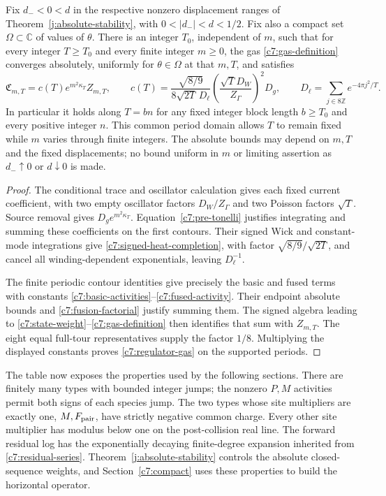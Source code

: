 \begin{proposition}\label{c7:gas-identity}
Fix $d_-<0<d$ in the respective nonzero displacement ranges of
Theorem~\ref{j:absolute-stability}, with $0<|d_-|<d<1/2$.
Fix also a compact set $\Omega\subset\mathbb C$ of values of $\theta$.
There is an integer $T_0$, independent of $m$, such that for every integer
$T\ge T_0$ and every finite integer $m\ge0$, the gas
\eqref{c7:gas-definition} converges absolutely, uniformly for
$\theta\in\Omega$ at that $m,T$, and satisfies
\begin{equation}\label{c7:regulator-gas}
\mathfrak C_{m,T}=c(T)e^{m^2\kappa_T}Z_{m,T},\qquad
c(T)=\frac{\sqrt{8/9}}{8\sqrt{2T}\,D_\ell}
 \left(\frac{\sqrt T D_W}{Z_\Gamma}\right)^2D_g,
\qquad D_\ell=\sum_{j\in8\mathbb Z}e^{-4\pi j^2/T}.
\end{equation}
In particular it holds along $T=bn$ for any fixed integer block length
$b\ge T_0$ and every positive integer $n$.  This common period domain allows
$T$ to remain fixed while $m$ varies through finite integers.  The absolute
bounds may depend on $m,T$ and the fixed displacements; no bound uniform in
$m$ or limiting assertion as $d_-\uparrow0$ or $d\downarrow0$ is made.
\end{proposition}

\begin{proof}
The conditional trace and oscillator calculation gives each fixed current
coefficient, with two empty oscillator factors $D_W/Z_\Gamma$ and
two Poisson factors $\sqrt T$.  Source removal gives
$D_g e^{m^2\kappa_T}$.  Equation~\eqref{c7:pre-tonelli} justifies integrating
and summing these coefficients on the first contours.  Their signed Wick
and constant-mode integrations give \eqref{c7:signed-heat-completion}, with
factor $\sqrt{8/9}/\sqrt{2T}$, and cancel all winding-dependent exponentials,
leaving $D_\ell^{-1}$.

The finite periodic contour identities give precisely the basic and fused
terms with constants \eqref{c7:basic-activities}--\eqref{c7:fused-activity}.
Their endpoint absolute bounds and \eqref{c7:fusion-factorial} justify
summing them.  The signed algebra leading to
\eqref{c7:state-weight}--\eqref{c7:gas-definition} then identifies that sum
with $Z_{m,T}$.  The eight equal full-tour representatives supply the factor
$1/8$.  Multiplying the displayed constants proves
\eqref{c7:regulator-gas} on the supported periods.
\end{proof}

The table now exposes the properties used by the following sections.  There
are finitely many types with bounded integer jumps; the nonzero $P,M$
activities permit both signs of each species jump.  The two types whose
site multipliers are exactly one, $M,F_{\rm pair}$, have strictly negative
common charge.  Every other site multiplier has modulus below one on the
post-collision real line.  The forward residual log has the exponentially
decaying finite-degree expansion inherited from
\eqref{c7:residual-series}.  Theorem~\ref{j:absolute-stability} controls the
absolute closed-sequence weights, and Section~\ref{c7:compact} uses these
properties to build the horizontal operator.

